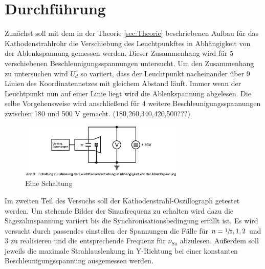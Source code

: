 \section{Durchführung}
\label{sec:Durchfuehrung}
Zunächst soll mit dem in der Theorie \ref{sec:Theorie} beschriebenen Aufbau für das Kathodenstrahlrohr die Verschiebung des Leuchtpunkftes in Abhängigkeit von der Ablenkspannung gemessen werden.
Dieser Zusammenhang wird für 5 verschiebenen Beschleunigungsspannungen untersucht.
Um den Zusammenhang zu untersuchen wird $U_d$ so variiert, dass der Leuchtpunkt nacheinander über 9 Linien des Koordinatennetzes mit gleichem Abstand läuft.
Immer wenn der Leuchtpunkt nun auf einer Linie liegt wird die Ablenkspannung abgelesen.
Die selbe Vorgehensweise wird anschließend für 4 weitere Beschleunigungsspannungen zwischen 180 und 500 V gemacht. (180,260,340,420,500???)
\begin{figure}
    \centering
    \includegraphics[width = 0.7\textwidth]{bilder/Schaltung.png}
    \caption{Eine Schaltung}
\end{figure}
Im zweiten Teil des Versuchs soll der Kathodenstrahl-Oszillograph getestet werden.
Um stehende Bilder der Sinusfrequenz zu erhalten wird dazu die Sägezahnspannung variiert bis die Synchronisationsbedingung erfüllt ist.
Es wird versucht durch passendes einstellen der Spannungen die Fälle für $n = \sfrac{1}{2},1,2$ und $3$ zu realisieren und die entsprechende Frequenz für $\nu_{Sä}$ abzulesen.
Außerdem soll jeweils die maximale Strahlauslenkung in Y-Richtung bei einer konstanten Beschleunigungsspannung ausgemessen werden.